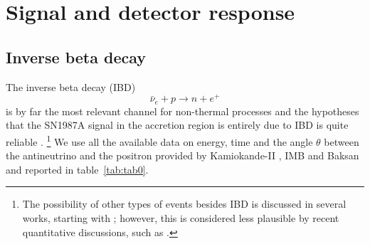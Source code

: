 \documentclass[a4paper,11pt]{article}
\newcommand*{\blu}{\textcolor{blue}}
\begin{document}
\section{Signal and detector response}





\subsection{Inverse beta decay}
The inverse beta decay (IBD)
\begin{equation}
    \bar{\nu}_e + p\rightarrow n+e^+
\end{equation}
is by far the most relevant channel for non-thermal processes and the hypotheses that the SN1987A signal in the accretion region is entirely due to IBD is quite reliable \cite{PhysRevD.36.2283,Vissani:2014doa,Tomas:2003xn,Costantini:2004ry,Vissani:2008wbj}. \footnote{The possibility of other types of events besides IBD is discussed in several works, starting with
\cite{PhysRevD.36.2283}; however, this is  considered less plausible by recent quantitative discussions, such as \cite{Vissani:2014doa}.}
%
We use all the available data on energy, time and the angle $\theta$  between the antineutrino and the positron provided  by Kamiokande-II \cite{hirataPhysRevLett.58.1490,PhysRevD.38.448},  IMB \cite{PhysRevLett.58.1494,PhysRevD.37.3361} and  Baksan \cite{ALEXEYEV1988209} and 
reported in table~\ref{tab:tab0}. 
%
%
\end{document}
